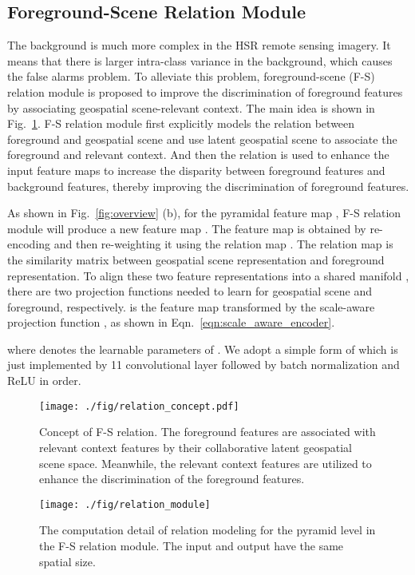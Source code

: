 \documentclass[10pt,twocolumn,letterpaper]{article}
\begin{document}
\subsection{Foreground-Scene Relation Module}
\label{sec:relation}
The background is much more complex in the HSR remote sensing imagery.
It means that there is larger intra-class variance in the background, which causes the false alarms problem.
To alleviate this problem, foreground-scene (F-S) relation module is proposed to improve the discrimination of foreground features by associating geospatial scene-relevant context.
The main idea is shown in Fig.~\ref{fig:relation_concept}.
F-S relation module first explicitly models the relation between foreground and geospatial scene and use latent geospatial scene to associate the foreground and relevant context.
And then the relation is used to enhance the input feature maps to increase the disparity  between foreground features and background features, thereby improving the discrimination of foreground features.

As shown in Fig.~\ref{fig:overview} (b), for the pyramidal feature map , F-S relation module will produce a new feature map .
The feature map  is obtained by re-encoding  and then re-weighting it using the relation map .
The relation map  is the similarity matrix between geospatial scene representation and foreground representation.
To align these two feature representations into a shared manifold , there are two projection functions needed to learn for geospatial scene and foreground, respectively.
 is the feature map  transformed by the scale-aware projection function 
, as shown in Eqn.~\ref{eqn:scale_aware_encoder}.

where  denotes the learnable parameters of .
We adopt a simple form of  which is just implemented by 11 convolutional layer followed by batch normalization and ReLU in order.
\begin{figure}[hbt]
   \begin{center}
      \texttt{[image: ./fig/relation\_concept.pdf]}
   \end{center}
   \caption{Concept of F-S relation.
      The foreground features are associated with relevant context features by their collaborative latent geospatial scene space. Meanwhile, the relevant context features are utilized to enhance the discrimination of the foreground features.}
   \label{fig:relation_concept}
\end{figure}

\begin{figure}[hbt]
   \begin{center}
      \texttt{[image: ./fig/relation\_module]}
   \end{center}
   \caption{The computation detail of relation modeling for the pyramid level  in the F-S relation module. The input and output have the same spatial size.}
   \label{fig:relation_module}
\end{figure}
\end{document}
